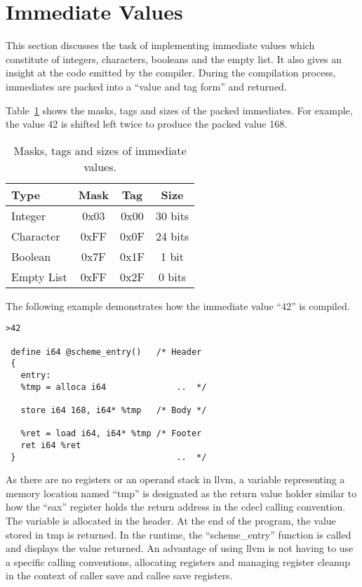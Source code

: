 \documentclass{article}
\begin{document}
\section{Immediate Values}

This section discusses the task of implementing immediate values which constitute of integers, characters, booleans and the empty list. It also gives an insight at the code emitted by the compiler. During the compilation process, immediates are packed into a ``value and tag form'' and returned.

Table~\ref{tab:immediates} shows the masks, tags and sizes of the packed immediates. For example, the value 42 is shifted left twice to produce the packed value 168.

\begin{table}[ht]
  \centering
\begin{tabular}{ l c c c }
  \toprule
  Type & Mask & Tag & Size \\ \hline
  \midrule
  Integer & 0x03 & 0x00 & 30 bits  \\
  Character & 0xFF & 0x0F & 24 bits  \\
  Boolean & 0x7F & 0x1F & 1 bit \\
  Empty List & 0xFF & 0x2F & 0 bits \\
  \bottomrule
\end{tabular}
\caption{Masks, tags and sizes of immediate values.} \label{tab:immediates}
\end{table}

The following example demonstrates how the immediate value ``42'' is compiled. 

\begin{verbatim}
>42

 define i64 @scheme_entry()   /* Header 
 {                            
   entry:
   %tmp = alloca i64              ..  */

   store i64 168, i64* %tmp   /* Body */ 

   %ret = load i64, i64* %tmp /* Footer
   ret i64 %ret                   
 }                                ..  */
\end{verbatim}

As there are no registers or an operand stack in llvm, a variable representing a memory location named ``tmp'' is designated as the return value holder similar to how the ``eax'' register holds the return address in the cdecl calling convention. The variable is allocated in the header. At the end of the program, the value stored in tmp is returned. In the runtime, the ``scheme\_entry'' function is called and displays the value returned. An advantage of using llvm is not having to use a specific calling conventions, allocating registers and managing register cleanup in the context of caller save and callee save registers.
\end{document}
